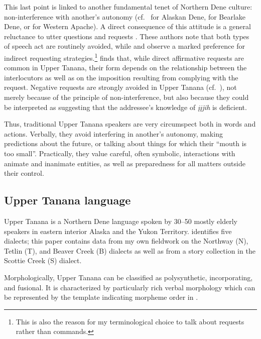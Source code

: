 \documentclass[output=paper,colorlinks,citecolor=brown
]{langscibook}
\begin{document}
This last point is linked to another fundamental tenet of Northern Dene culture: non-interference with another's autonomy (cf.\  \citealp{ScollonRScollonS1981} for Alaskan Dene, \citealp{RushforthSChisholmJ1991} for Bearlake Dene, or \citealp{BassoK1979, BassoK1990} for Western Apache). A direct consequence of this attitude is a general reluctance to utter questions and requests \citep{ScollonRScollonS1981}. These authors note that both types of speech act are routinely avoided, while \citet{RushforthS1985} and \citet{RushforthSChisholmJ1991} observe a marked preference for indirect requesting strategies.\footnote{This is also the reason for my terminological choice to talk about requests rather than commands.} \citet{LovickO2016} finds that, while direct affirmative requests are common in Upper Tanana, their form depends on the relationship between the interlocutors as well as on the imposition resulting from complying with the request. Negative requests are strongly avoided in Upper Tanana (cf.\  \citealt{LovickO2016, LovickOTuttleS2019}), not merely because of the principle of non-interference, but also because they could be interpreted as suggesting that the addressee's knowledge of \textit{įįjih} is deficient.

Thus, traditional Upper Tanana speakers are very circumspect both in words and actions. Verbally, they avoid interfering in another's autonomy, making predictions about the future, or talking about things for which their ``mouth is too small''. Practically, they value careful, often symbolic, interactions with animate and inanimate entities, as well as preparedness for all matters outside their control. 

\subsection{Upper Tanana language}
\label{subsection:upper-tanana}

Upper Tanana is a Northern Dene language spoken by 30–50 mostly elderly speakers in eastern interior Alaska and the Yukon Territory. \citet{MinouraN1994} identifies five dialects; this paper contains data from my own fieldwork on the Northway (N), Tetlin (T), and Beaver Creek (B) dialects as well as from a story collection \citep{TyoneM1996} in the Scottie Creek (S) dialect.

Morphologically, Upper Tanana can be classified as polysynthetic, incorporating, and fusional. It is characterized by particularly rich verbal morphology which can be represented by the template indicating morpheme order in .
\end{document}
